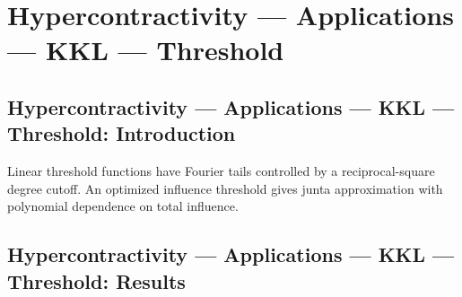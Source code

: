 \section{Hypercontractivity --- Applications --- KKL --- Threshold}
\subsection*{Hypercontractivity --- Applications --- KKL --- Threshold: Introduction}
Linear threshold functions have Fourier tails controlled by a reciprocal-square degree cutoff. An optimized influence threshold gives junta approximation with polynomial dependence on total influence.

\subsection*{Hypercontractivity --- Applications --- KKL --- Threshold: Results}

